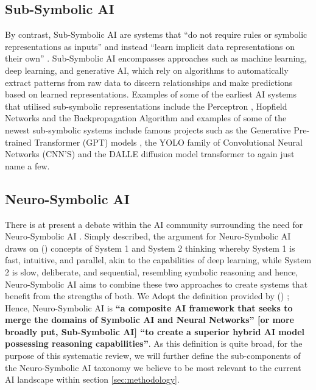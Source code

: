 \documentclass[hf]{ceurart}
\newcommand{\citeauthornum}[1]{\citeauthor{#1} (\citeyear{#1}) \cite{#1}}
\begin{document}
\subsection{\textbf{Sub-Symbolic AI}}
By contrast, Sub-Symbolic AI are systems that \enquote{do not require rules or symbolic representations as inputs} and instead \enquote{learn implicit data representations on their own} \cite{Dingli2023}. Sub-Symbolic AI encompasses approaches such as machine learning, deep learning, and generative AI, which rely on algorithms to automatically extract patterns from raw data to discern relationships and make predictions based on learned representations. Examples of some of the earliest AI systems that utilised sub-symbolic representations include the Perceptron \cite{Rosenblatt1958}, Hopfield Networks \cite{Hopfield1982} and the Backpropagation Algorithm \cite{Rumelhart1986} and examples of some of the newest sub-symbolic systems include famous projects such as the Generative Pre-trained Transformer (GPT) models \cite{Vaswani2017}, the YOLO family of Convolutional Neural Networks (CNN'S) \cite{Redmon2015} and the DALLE diffusion model transformer \cite{Ramesh2021} to again just name a few. 


\subsection{\textbf{Neuro-Symbolic AI}}
There is at present a debate within the AI community surrounding the need for Neuro-Symbolic AI \cite{Garcez2023}. Simply described, the argument for Neuro-Symbolic AI draws on \citeauthornum{Kahneman2011} concepts of System 1 and System 2 thinking whereby System 1 is fast, intuitive, and parallel, akin to the capabilities of deep learning, while System 2 is slow, deliberate, and sequential, resembling symbolic reasoning and hence, Neuro-Symbolic AI aims to combine these two approaches to create systems that benefit from the strengths of both. We Adopt the definition provided by \citeauthornum{Garcez2023}; Hence, Neuro-Symbolic AI is \textbf{\enquote{a composite AI framework that seeks to merge the domains of Symbolic AI and Neural Networks} [or more broadly put, Sub-Symbolic AI] \enquote{to create a superior hybrid AI model possessing reasoning capabilities}}. As this definition is quite broad, for the purpose of this systematic review, we will further define the sub-components of the Neuro-Symbolic AI taxonomy we believe to be most relevant to the current AI landscape within section \ref{sec:methodology}. 
\end{document}
